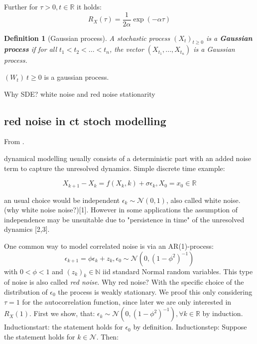 \documentclass[%
thesis=student,%
coverpage=false,%
titlepage=false,%
headmarks=true, %
german,%
font=libertine, %
math=newpxtx, %
BCOR=5mm,%
coverBCOR=11mm%
]{tumbook}
\newtheorem{definition}{Definition}[section]
\begin{document}
Further for $\tau > 0, t \in \mathbb{R}$ it holds:
\[
R_{X}(\tau) =  \frac{1}{2\alpha}\exp(-\alpha\tau)
\]







\begin{definition}[Gaussian process]
    A stochastic process $(X_{t})_{t\geq 0}$ is a \textbf{Gaussian process} if for all $t_{1} < t_{2} < ... < t_{n}$, the vector $(X_{t_{1}},...,X_{t_{n}})$ is a Gaussian process.
\end{definition}

$(W_{t}) \ t \geq 0$ is a gaussian process.



Why SDE?
white noise and red noise
stationarity

\subsection{red noise in ct stoch modelling}
From \cite{Morr:2022}.

dynamical modelling usually consists of a deterministic part with an added noise term to capture the unresolved dynamics. Simple discrete time example:

\begin{equation}
    X_{k+1}-X_{k} = f(X_{k},k) + \sigma\epsilon_{k}, X_{0} = x_{0} \in \mathbb{R}
\end{equation}


an usual choice would be independent $\epsilon_{k} \sim \mathcal{N}(0,1)$, also called white noise. (why white noise noise?)[1].
However in some applications the assumption of independence may be unsuitable due to "persistence in time" of the unresolved dynamics [2,3].

One common way to model correlated noise is via an AR(1)-process:
\[
\epsilon_{k+1} = \phi\epsilon_{k} + z_{k}, \epsilon_{0} \sim \mathcal{N}(0,(1-\phi^2)^{-1})
\]
with $0<\phi<1$ and $(z_{k})_{k}\in\mathbb{N}$ iid standard Normal random variables. This type of noise is also called \textit{red noise}. Why red noise? With the specific choice of the distribution of $\epsilon_{0}$ the process is weakly stationary. We proof this only considering $\tau = 1$ for the autocorrelation function, since later we are only interested in $R_{X}(1)$. First we show, that: $\epsilon_{k} \sim \mathcal{N}(0,(1-\phi^2)^{-1}), \forall k \in \mathbb{R}$ by induction. Inductionstart: the statement holds for $\epsilon_{0}$ by definition.
Inductionstep: Suppose the statement holds for $k \in \mathcal{N}$. Then:
\end{document}
